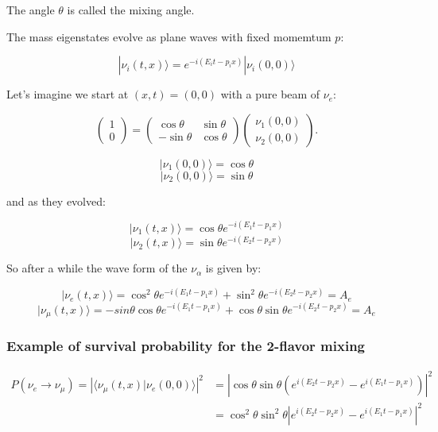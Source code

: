 \documentclass[
  letterpaper,
  DIV=11,
  numbers=noendperiod]{scrreprt}
\begin{document}
The angle \(\theta\) is called the mixing angle.

The mass eigenstates evolve as plane waves with fixed momemtum \(p\):

\[|\nu_{i}(t, x)\rangle = e^{ -i (E_{i} t - p_i x) }|\nu_{i}(0,0)\rangle\]

Let's imagine we start at \((x,t) = (0,0)\) with a pure beam of
\(\nu_e\):

\[\begin{pmatrix} 1 \\ 0 \end{pmatrix} = \begin{pmatrix} \cos\theta & \sin\theta \\ -\sin\theta & \cos\theta \end{pmatrix} \begin{pmatrix} \nu_1(0,0) \\ \nu_2(0,0) \end{pmatrix}.\]

\[|\nu_{1}(0,0)\rangle = \cos \theta\]
\[|\nu_{2}(0,0)\rangle = \sin \theta\]

and as they evolved:

\[|\nu_{1}(t,x)\rangle = \cos \theta e^{ -i (E_{1} t - p_1 x)  }\]
\[|\nu_{2}(t,x)\rangle = \sin \theta e^{ -i (E_{2} t - p_2 x) }\]

So after a while the wave form of the \(\nu_\alpha\) is given by:

\[|\nu_{e}(t, x)\rangle = \cos^2 \theta e^{ -i (E_{1} t - p_1 x)  } + \sin^2 \theta e^{ -i (E_{2} t - p_2 x) } = A_e\]
\[|\nu_{\mu}(t, x)\rangle = -sin\theta\cos \theta e^{ -i (E_{1} t - p_1 x)  } + \cos\theta\sin \theta e^{ -i (E_{2} t - p_2 x) } = A_e\]

\subsubsection*{Example of survival probability for the 2-flavor
mixing}\label{example-of-survival-probability-for-the-2-flavor-mixing}

\[\begin{aligned}
P(\nu_e \rightarrow \nu_\mu) = \left|\langle \nu_{\mu}(t,x)|\nu_{e}(0,0)\rangle\right|^2 &=\left|\cos\theta \sin\theta (e^{i(E_2 t - p_2 x)} - e^{i(E_1 t -p_1 x)})\right|^2\\
&=
\cos^2\theta\sin^2\theta \left|e^{i(E_2 t - p_2 x)} - e^{i(E_1 t -p_1 x)}\right|^2
\end{aligned}
\]
\end{document}
